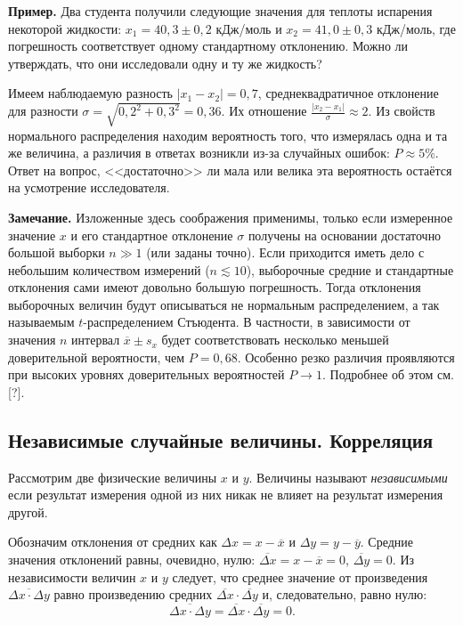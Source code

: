 \documentclass[10pt]{article}
\begin{document}
\textbf{\footnotesize{}Пример.}{\footnotesize{} Два студента получили
следующие значения для теплоты испарения некоторой жидкости: $x_{1}=40{,}3\pm0{,}2$
кДж/моль и $x_{2}=41{,}0\pm0{,}3$ кДж/моль, где погрешность соответствует
одному стандартному отклонению. Можно ли утверждать, что они исследовали
одну и ту же жидкость?}{\footnotesize\par}

{\footnotesize{}Имеем наблюдаемую разность $\left|x_{1}-x_{2}\right|=0{,}7$,
среднеквадратичное отклонение для разности $\sigma=\sqrt{0{,}2^{2}+0{,}3^{2}}=0{,}36$.
Их отношение $\frac{\left|x_{2}-x_{1}\right|}{\sigma}\approx2$. Из
свойств нормального распределения находим вероятность того, что измерялась
одна и та же величина, а различия в ответах возникли из-за случайных
ошибок: $P\approx5\%$. Ответ на вопрос, <<достаточно>>
ли мала или велика эта вероятность остаётся на усмотрение исследователя.}{\footnotesize\par}

\textbf{\footnotesize{}Замечание.}{\footnotesize{} Изложенные здесь
соображения применимы, только если измеренное значение $x$ и его
стандартное отклонение $\sigma$ получены на основании достаточно
большой выборки $n\gg1$ (или заданы точно). Если приходится иметь
дело с небольшим количеством измерений ($n\lesssim10$), выборочные
средние и стандартные отклонения сами имеют довольно большую погрешность.
Тогда отклонения выборочных величин будут описываться не нормальным
распределением, а так называемым $t$-распределением Стъюдента. В
частности, в зависимости от значения $n$ интервал $\overline{x}\pm s_{x}$
будет соответствовать несколько меньшей доверительной вероятности,
чем $P=0{,}68$. Особенно резко различия проявляются при высоких уровнях
доверительных вероятностей $P\to1$. Подробнее об этом см. {[}?{]}.}{\footnotesize\par}

\subsection{Независимые случайные величины. Корреляция}

Рассмотрим две физические величины $x$ и $y$. Величины называют
\emph{независимыми} если результат измерения одной из них никак не
влияет на результат измерения другой.

Обозначим отклонения от средних как $\Delta x=x-\overline{x}$ и $\Delta y=y-\overline{y}$.
Средние значения отклонений равны, очевидно, нулю: $\overline{\Delta x}=x-\overline{x}=0$,
$\overline{\Delta y}=0$. Из независимости величин $x$ и $y$ следует,
что среднее значение от произведения $\overline{\Delta x\cdot\Delta y}$
равно произведению средних $\overline{\Delta x}\cdot\overline{\Delta y}$
и, следовательно, равно нулю: 
\begin{equation}
\overline{\Delta x\cdot\Delta y}=\overline{\Delta x}\cdot\overline{\Delta y}=0.\label{eq:indep}
\end{equation}
\end{document}
